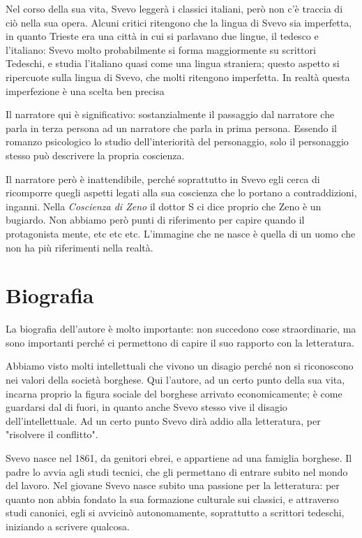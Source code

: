\documentclass[a4paper, twoside, titlepage]{book}
\begin{document}
Nel corso della sua vita, Svevo leggerà i classici italiani, però non c'è traccia di ciò nella sua opera. Alcuni critici ritengono che la lingua di Svevo sia imperfetta, in quanto Trieste era una città in cui si parlavano due lingue, il tedesco e l'italiano: Svevo molto probabilmente si forma maggiormente su scrittori Tedeschi, e studia l'italiano quasi come una lingua straniera; questo aspetto si ripercuote sulla lingua di Svevo, che molti ritengono imperfetta.
In realtà questa imperfezione è una scelta ben precisa

Il narratore qui è significativo: sostanzialmente il passaggio dal narratore che parla in terza persona ad un narratore che parla in prima persona. Essendo il romanzo psicologico lo studio dell'interiorità del personaggio, solo il personaggio stesso può descrivere la propria coscienza.

Il narratore però è inattendibile, perché soprattutto in Svevo egli cerca di ricomporre quegli aspetti legati alla sua coscienza che lo portano a contraddizioni, inganni. Nella \textit{Coscienza di Zeno} il dottor S ci dice proprio che Zeno è un bugiardo. Non abbiamo però punti di riferimento per capire quando il protagonista mente, etc etc etc. L'immagine che ne nasce è quella di un uomo che non ha più riferimenti nella realtà.

\section{Biografia}

La biografia dell'autore è molto importante: non succedono cose straordinarie, ma sono importanti perché ci permettono di capire il suo rapporto con la letteratura.

Abbiamo visto molti intellettuali che vivono un disagio perché non si riconoscono nei valori della società borghese. Qui l'autore, ad un certo punto della sua vita, incarna proprio la figura sociale del borghese arrivato economicamente; è come guardarsi dal di fuori, in quanto anche Svevo stesso vive il disagio dell'intellettuale.
Ad un certo punto Svevo dirà addio alla letteratura, per "risolvere il conflitto".

Svevo nasce nel 1861, da genitori ebrei, e appartiene ad una famiglia borghese. Il padre lo avvia agli studi tecnici, che gli permettano di entrare subito nel mondo del lavoro.
Nel giovane Svevo nasce subito una passione per la letteratura: per quanto non abbia fondato la sua formazione culturale sui classici, e attraverso studi canonici, egli si avvicinò autonomamente, soprattutto a scrittori tedeschi, iniziando a scrivere qualcosa.
\end{document}
